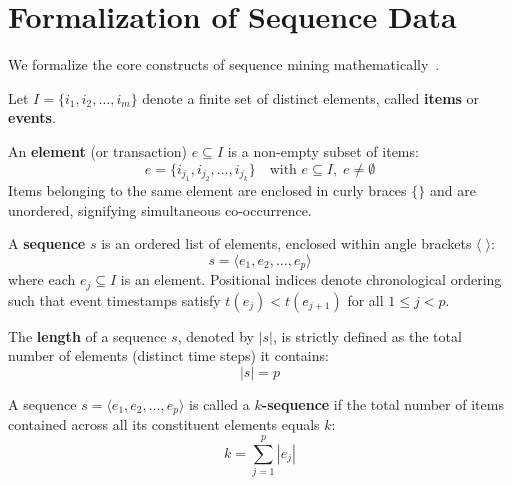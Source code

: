 \section{Formalization of Sequence Data}
\label{sec:dm-seq-formal-definition}

We formalize the core constructs of sequence mining mathematically~\cite{tan2018, agrawal1995}.

\begin{definition}
Let $I = \{i_1, i_2, \dots, i_m\}$ denote a finite set of distinct elements, called \textbf{items} or \textbf{events}.
\end{definition}

\begin{definition}
An \textbf{element} (or transaction) $e \subseteq I$ is a non-empty subset of items:
\begin{equation}
e = \{i_{j_1}, i_{j_2}, \dots, i_{j_k}\} \quad \text{with } e \subseteq I, \; e \neq \emptyset
\end{equation}
Items belonging to the same element are enclosed in curly braces $\{ \}$ and are unordered, signifying simultaneous co-occurrence.
\end{definition}

\begin{definition}[Sequence]
A \textbf{sequence} $s$ is an ordered list of elements, enclosed within angle brackets $\langle \;\rangle$:
\begin{equation}
\label{eq:seq-formal-def-en}
s = \langle e_1, e_2, \dots, e_p \rangle
\end{equation}
where each $e_j \subseteq I$ is an element. Positional indices denote chronological ordering such that event timestamps satisfy $t(e_j) < t(e_{j+1})$ for all $1 \le j < p$.
\end{definition}

\begin{definition}
The \textbf{length} of a sequence $s$, denoted by $|s|$, is strictly defined as the total number of elements (distinct time steps) it contains:
\begin{equation}
|s| = p
\end{equation}
\end{definition}

\begin{definition}[$k$-Sequence]
A sequence $s = \langle e_1, e_2, \dots, e_p \rangle$ is called a \textbf{$k$-sequence} if the total number of items contained across all its constituent elements equals $k$:
\begin{equation}
\label{eq:seq-k-sequence-en}
k = \sum_{j=1}^{p} |e_j|
\end{equation}
\end{definition}

